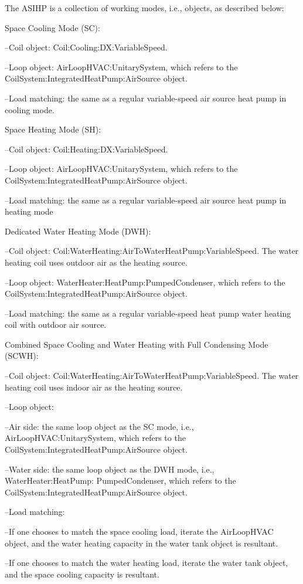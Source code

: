 The ASIHP is a collection of working modes, i.e., objects, as described below:

Space Cooling Mode (SC):

--Coil object: Coil:Cooling:DX:VariableSpeed.

--Loop object: AirLoopHVAC:UnitarySystem,  which refers to the CoilSystem:IntegratedHeatPump:AirSource object.

--Load matching: the same as a regular variable-speed air source heat pump in cooling mode.

Space Heating Mode (SH):

--Coil object: Coil:Heating:DX:VariableSpeed.

--Loop object: AirLoopHVAC:UnitarySystem, which refers to the CoilSystem:IntegratedHeatPump:AirSource object.

--Load matching: the same as a regular variable-speed air source heat pump in heating mode

Dedicated Water Heating Mode (DWH):

--Coil object: Coil:WaterHeating:AirToWaterHeatPump:VariableSpeed. The water heating coil uses outdoor air as the heating source.

--Loop object: WaterHeater:HeatPump:PumpedCondenser, which refers to the CoilSystem:IntegratedHeatPump:AirSource object.

--Load matching: the same as a regular variable-speed heat pump water heating coil with outdoor air source.

Combined Space Cooling and Water Heating with Full Condensing Mode (SCWH):

--Coil object: Coil:WaterHeating:AirToWaterHeatPump:VariableSpeed. The water heating coil uses indoor air as the heating source.

--Loop object:

--Air side: the same loop object as the SC mode, i.e., AirLoopHVAC:UnitarySystem, which refers to the CoilSystem:IntegratedHeatPump:AirSource object.

--Water side: the same loop object as the DWH mode, i.e., WaterHeater:HeatPump: PumpedCondenser, which refers to the CoilSystem:IntegratedHeatPump:AirSource object.

--Load matching:

--If one chooses to match the space cooling load, iterate the AirLoopHVAC object, and the water heating capacity in the water tank object is resultant.

--If one chooses to match the water heating load, iterate the water tank object, and the space cooling capacity is resultant.

